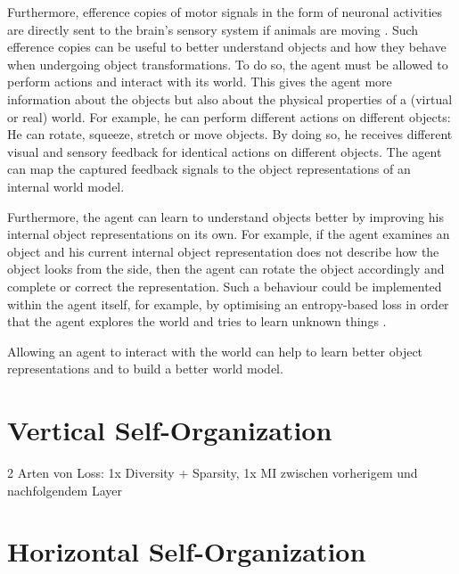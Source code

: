 Furthermore, efference copies of motor signals in the form of neuronal activities are directly sent to the brain’s sensory system if animals are moving .
Such efference copies can be useful to better understand objects and how they behave when undergoing object transformations.
To do so, the agent must be allowed to perform actions and interact with its world.
This gives the agent more information about the objects but also about the physical properties of a (virtual or real) world. For example, he can perform different actions on different objects: He can rotate, squeeze, stretch or move objects. By doing so, he receives different visual and sensory feedback for identical actions on different objects.
The agent can map the captured feedback signals to the object representations of an internal world model.

Furthermore, the agent can learn to understand objects better by improving his internal object representations on its own. For example, if the agent examines an object and his current internal object representation does not describe how the object looks from the side, then the agent can rotate the object accordingly and complete or correct the representation. 
Such a behaviour could be implemented within the agent itself, for example, by optimising an entropy-based loss in order that the agent explores the world and tries to learn unknown things .


\begin{claim}
	Allowing an agent to interact with the world can help to learn better object representations and to build a better world model.
\end{claim}







\section{Vertical Self-Organization}
2 Arten von Loss: 1x Diversity + Sparsity, 1x MI zwischen vorherigem und nachfolgendem Layer

\section{Horizontal Self-Organization}